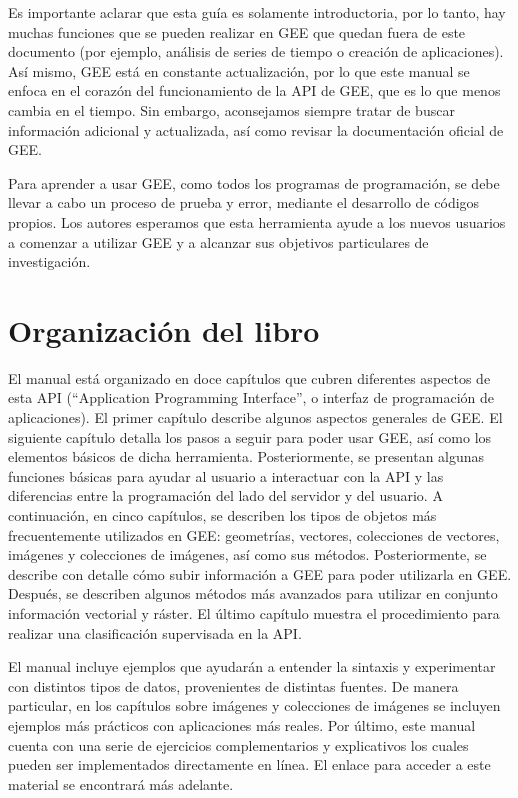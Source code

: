 \documentclass[
  12pt,
  letterpaper,
  twoside]{book}
\begin{document}
Es importante aclarar que esta guía es solamente introductoria, por lo tanto, hay muchas funciones que se pueden realizar en GEE que quedan fuera de este documento (por ejemplo, análisis de series de tiempo o creación de aplicaciones). Así mismo, GEE está en constante actualización, por lo que este manual se enfoca en el corazón del funcionamiento de la API de GEE, que es lo que menos cambia en el tiempo. Sin embargo, aconsejamos siempre tratar de buscar información adicional y actualizada, así como revisar la documentación oficial de GEE.

Para aprender a usar GEE, como todos los programas de programación, se debe llevar a cabo un proceso de prueba y error, mediante el desarrollo de códigos propios. Los autores esperamos que esta herramienta ayude a los nuevos usuarios a comenzar a utilizar GEE y a alcanzar sus objetivos particulares de investigación.

\hypertarget{organizaciuxf3n-del-libro}{%
\section{Organización del libro}\label{organizaciuxf3n-del-libro}}

El manual está organizado en doce capítulos que cubren diferentes aspectos de esta API (``Application Programming Interface'', o interfaz de programación de aplicaciones). El primer capítulo describe algunos aspectos generales de GEE. El siguiente capítulo detalla los pasos a seguir para poder usar GEE, así como los elementos básicos de dicha herramienta. Posteriormente, se presentan algunas funciones básicas para ayudar al usuario a interactuar con la API y las diferencias entre la programación del lado del servidor y del usuario. A continuación, en cinco capítulos, se describen los tipos de objetos más frecuentemente utilizados en GEE: geometrías, vectores, colecciones de vectores, imágenes y colecciones de imágenes, así como sus métodos. Posteriormente, se describe con detalle cómo subir información a GEE para poder utilizarla en GEE. Después, se describen algunos métodos más avanzados para utilizar en conjunto información vectorial y ráster. El último capítulo muestra el procedimiento para realizar una clasificación supervisada en la API.

El manual incluye ejemplos que ayudarán a entender la sintaxis y experimentar con distintos tipos de datos, provenientes de distintas fuentes. De manera particular, en los capítulos sobre imágenes y colecciones de imágenes se incluyen ejemplos más prácticos con aplicaciones más reales. Por último, este manual cuenta con una serie de ejercicios complementarios y explicativos los cuales pueden ser implementados directamente en línea. El enlace para acceder a este material se encontrará más adelante.
\end{document}

